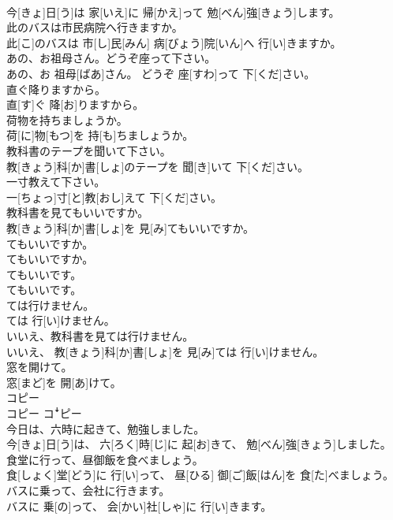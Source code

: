 \documentclass[8pt]{extreport}
\begin{document}
\begin{CJK}{UTF8}{min}
\\	今[きょ]日[う]は 家[いえ]に 帰[かえ]って 勉[べん]強[きょう]します。
\\	此のバスは市民病院へ行きますか。	
\\	此[こ]のバスは 市[し]民[みん] 病[びょう]院[いん]へ 行[い]きますか。
\\	あの、お祖母さん。どうぞ座って下さい。	
\\	あの、お 祖母[ばあ]さん。 どうぞ 座[すわ]って 下[くだ]さい。
\\	直ぐ降りますから。	
\\	直[す]ぐ 降[お]りますから。
\\	荷物を持ちましょうか。	
\\	荷[に]物[もつ]を 持[も]ちましょうか。
\\	教科書のテープを聞いて下さい。	
\\	教[きょう]科[か]書[しょ]のテープを 聞[き]いて 下[くだ]さい。
\\	一寸教えて下さい。	
\\	一[ちょっ]寸[と]教[おし]えて 下[くだ]さい。
\\	教科書を見てもいいですか。	
\\	教[きょう]科[か]書[しょ]を 見[み]てもいいですか。
\\	てもいいですか。	
\\	てもいいですか。
\\	てもいいです。	
\\	てもいいです。
\\	ては行けません。	
\\	ては 行[い]けません。
\\	いいえ、教科書を見ては行けません。	
\\	いいえ、 教[きょう]科[か]書[しょ]を 見[み]ては 行[い]けません。
\\	窓を開けて。	
\\	窓[まど]を 開[あ]けて。
\\	コピー	
\\	コピー	コꜜピー
\\	今日は、六時に起きて、勉強しました。	
\\	今[きょ]日[う]は、 六[ろく]時[じ]に 起[お]きて、 勉[べん]強[きょう]しました。
\\	食堂に行って、昼御飯を食べましょう。	
\\	食[しょく]堂[どう]に 行[い]って、 昼[ひる] 御[ご]飯[はん]を 食[た]べましょう。
\\	バスに乗って、会社に行きます。	
\\	バスに 乗[の]って、 会[かい]社[しゃ]に 行[い]きます。

\end{CJK}
\end{document}
